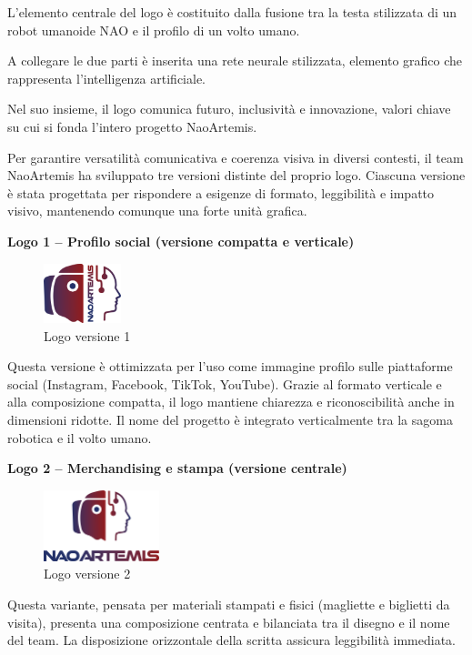 \documentclass{optica-article}
\begin{document}
L’elemento centrale del logo \`e costituito dalla fusione tra la testa stilizzata di un robot umanoide NAO e il profilo di un volto umano. 

A collegare le due parti \`e inserita una rete neurale stilizzata, elemento grafico che rappresenta l’intelligenza artificiale. 

Nel suo insieme, il logo comunica futuro, inclusivit\`a e innovazione, valori chiave su cui si fonda l’intero progetto NaoArtemis.

Per garantire versatilit\`a comunicativa e coerenza visiva in diversi contesti, il team NaoArtemis ha sviluppato tre versioni distinte del proprio logo. Ciascuna versione \`e stata progettata per rispondere a esigenze di formato, leggibilit\`a e impatto visivo, mantenendo comunque una forte unit\`a grafica.

\textbf{Logo 1 -- Profilo social (versione compatta e verticale)}\\
\begin{figure}[H]
    \centering
    \includegraphics[width=0.2\textwidth]{figures/logo_v1.png}
    \caption{Logo versione 1}
    \label{fig:logo_v1}
\end{figure}

Questa versione \`e ottimizzata per l’uso come immagine profilo sulle piattaforme social (Instagram, Facebook, TikTok, YouTube). Grazie al formato verticale e alla composizione compatta, il logo mantiene chiarezza e riconoscibilit\`a anche in dimensioni ridotte. Il nome del progetto \`e integrato verticalmente tra la sagoma robotica e il volto umano.

\textbf{Logo 2 -- Merchandising e stampa (versione centrale)}\\
\begin{figure}[H]
    \centering
    \includegraphics[width=0.3\textwidth]{figures/logo_v2.png}
    \caption{Logo versione 2}
    \label{fig:logo_v2}
\end{figure}
Questa variante, pensata per materiali stampati e fisici (magliette e biglietti da visita), presenta una composizione centrata e bilanciata tra il disegno e il nome del team. La disposizione orizzontale della scritta assicura leggibilit\`a immediata.
\end{document}
